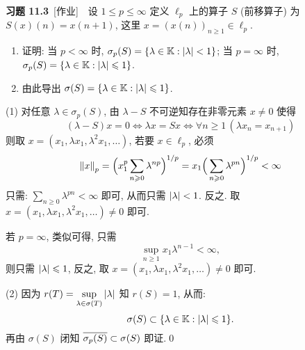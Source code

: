 	\textbf{习题 11.3}\ [作业]\ \ 设 $ 1\leqslant p\leqslant\infty $ 定义 $ \ell_{p} $ 上的算子 $ S $ (前移算子) 为 $ S(x)(n)=x(n+1) $, 这里 $ x=(x(n))_{n\geqslant1}\in\ell_{p} $.
	\begin{enumerate}[(1)]
		\item 证明: 当 $ p<\infty $ 时, $ \sigma_{p}(S)=\{ \lambda\in\K:\abs{\lambda}<1 \} $; 当 $ p=\infty $ 时, $ \sigma_{p}(S)=\{ \lambda\in\K:\abs{\lambda}\leqslant1 \} $.
		\item 由此导出 $ \sigma(S)=\{ \lambda\in\K:\abs{\lambda}\leqslant1 \} $.
	\end{enumerate}
	\begin{Proof}
		(1) 对任意 $ \lambda\in\sigma_{p}(S) $, 由 $ \lambda-S $ 不可逆知存在非零元素 $ x\ne 0 $ 使得
		\[
			(\lambda-S)x=0\Longleftrightarrow \lambda x=Sx\Longleftrightarrow \forall n\geqslant1\,(\lambda x_{n}=x_{n+1})
		\]
		则取 $ x=(x_{1}, \lambda x_{1}, \lambda^{2}x_{1}, \dots) $, 若要 $ x\in\ell_{p} $, 必须
		\[
			\norm{x}_{p}=\Big( x_{1}^{p}\sum_{n\geqslant0}\lambda^{np} \Big)^{1/p}=x_{1}\Big( \sum_{n\geqslant0}\lambda^{pn} \Big)^{1/p}<\infty
		\]
		只需: $ \sum\limits_{n\geqslant0}\lambda^{pn}<\infty $ 即可, 从而只需 $ \abs{\lambda}<1 $. 反之. 取 $ x=(x_{1}, \lambda x_{1}, \lambda^{2}x_{1}, \dots)\ne0 $ 即可.

		若 $ p=\infty $, 类似可得, 只需
		\[
			\sup_{n\geqslant1}x_{1}\lambda^{n-1}<\infty,
		\]
		则只需 $ \abs{\lambda}\leqslant1 $, 反之, 取 $ x=(x_{1}, \lambda x_{1}, \lambda^{2}x_{1}, \dots)\ne 0 $ 即可.

		(2) 因为 $ r(T)=\sup\limits_{\lambda\in\sigma(T)}\abs{\lambda} $ 知 $ r(S)=1 $, 从而:
		\[
			\sigma(S)\subset\{ \lambda\in\K:\abs{\lambda}\leqslant1 \}.
		\]
		再由 $ \sigma(S) $ 闭知 $ \baro{\sigma_{p}(S)}\subset\sigma(S) $ 即证.\qed
	\end{Proof}

